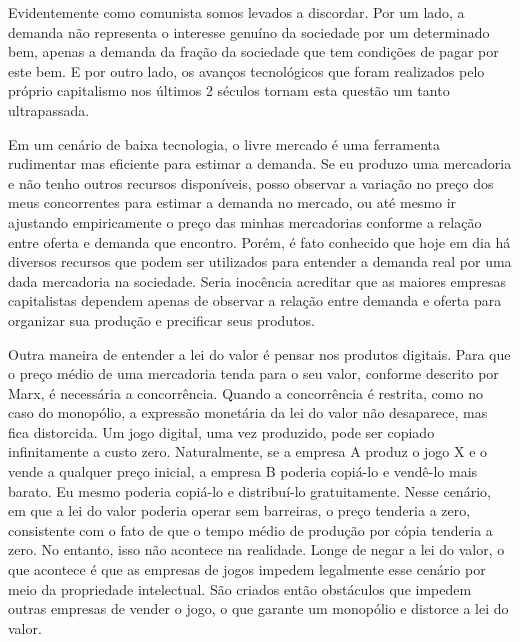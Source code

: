 Evidentemente como comunista somos levados a discordar. Por um lado, a demanda não representa o interesse genuíno da sociedade  por um determinado bem, apenas a demanda da fração da sociedade que tem condições de pagar por este bem. E por outro lado, os avanços tecnológicos que foram realizados pelo próprio capitalismo nos últimos 2 séculos tornam esta questão um tanto ultrapassada. 

Em um cenário de baixa tecnologia, o livre mercado é uma ferramenta rudimentar mas eficiente para estimar a demanda. Se eu produzo uma mercadoria e não tenho outros recursos disponíveis, posso observar a variação no preço dos meus concorrentes para estimar a demanda no mercado, ou até mesmo ir ajustando empiricamente o preço das minhas mercadorias conforme a relação entre oferta e demanda que encontro. Porém, é fato conhecido que hoje em dia há diversos recursos que podem ser utilizados para entender a demanda real por uma dada mercadoria na sociedade. Seria inocência acreditar que as maiores empresas capitalistas dependem apenas de observar a relação entre demanda e oferta para organizar sua produção e precificar seus produtos.

Outra maneira de entender a lei do valor é pensar nos produtos digitais. Para que o preço médio de uma mercadoria tenda para o seu valor, conforme descrito por Marx, é necessária a concorrência. Quando a concorrência é restrita, como no caso do monopólio, a expressão monetária da lei do valor não desaparece, mas fica distorcida. Um jogo digital, uma vez produzido, pode ser copiado infinitamente a custo zero. Naturalmente, se a empresa A produz o jogo X e o vende a qualquer preço inicial, a empresa B poderia copiá-lo e vendê-lo mais barato. Eu mesmo poderia copiá-lo e distribuí-lo gratuitamente. Nesse cenário, em que a lei do valor poderia operar sem barreiras, o preço tenderia a zero, consistente com o fato de que o tempo médio de produção por cópia tenderia a zero. No entanto, isso não acontece na realidade. Longe de negar a lei do valor, o que acontece é que as empresas de jogos impedem legalmente esse cenário por meio da propriedade intelectual. São criados então obstáculos que impedem outras empresas de vender o jogo, o que garante um monopólio e distorce a lei do valor.

